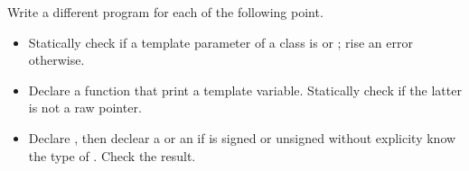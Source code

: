 Write a different program for each of the following point.
\begin{itemize}

    \item Statically check if a template parameter of a class is  or
    ; rise an error otherwise.

    \item Declare a function that print a template variable. Statically check
    if the latter is not a raw pointer.

    \item Declare , then declear a  or an 
    if  is signed or unsigned without explicity know the type of .
    Check the result.

\end{itemize}

